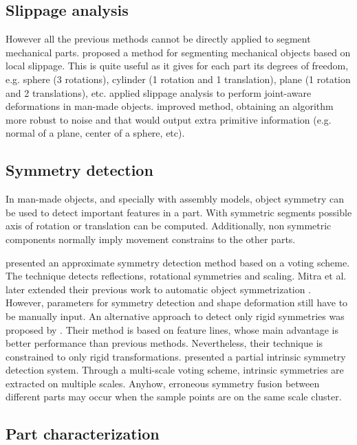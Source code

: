 \subsection{Slippage analysis}
\label{SlippageAnalysis}

However all the previous methods cannot be directly applied to segment mechanical parts.
\cite{Gelfand2004} proposed a method for segmenting mechanical objects based on local slippage.
This is quite useful as it gives for each part its degrees of freedom, e.g. sphere (3 rotations), cylinder (1 rotation and 1 translation), plane (1 rotation and 2 translations), etc.
\cite{Xu2009} applied slippage analysis to perform joint-aware deformations in man-made objects.
\cite{Yi2014} improved \cite{Gelfand2004} method, obtaining an algorithm more robust to noise and that would output extra primitive information (e.g. normal of a plane, center of a sphere, etc).

\subsection{Symmetry detection}

In man-made objects, and specially with assembly models, object symmetry can be used to detect important features in a part.
With symmetric segments possible axis of rotation or translation can be computed.
Additionally, non symmetric components normally imply movement constrains to the other parts.

\cite{Mitra2006} presented an approximate symmetry detection method based on a voting scheme.
The technique detects reflections, rotational symmetries and scaling.
Mitra et al. later extended their previous work to automatic object symmetrization \cite{Mitra2007}.
However, parameters for symmetry detection and shape deformation still have to be manually input.
An alternative approach to detect only rigid symmetries was proposed by \cite{Bokeloh2009}.
Their method is based on feature lines, whose main advantage is better performance than previous methods.
Nevertheless, their technique is constrained to only rigid transformations.
\cite{Xu2012} presented a partial intrinsic symmetry detection system.
Through a multi-scale voting scheme, intrinsic symmetries are extracted on multiple scales.
Anyhow, erroneous symmetry fusion between different parts may occur when the sample points are on the same scale cluster. 

\subsection{Part characterization}

